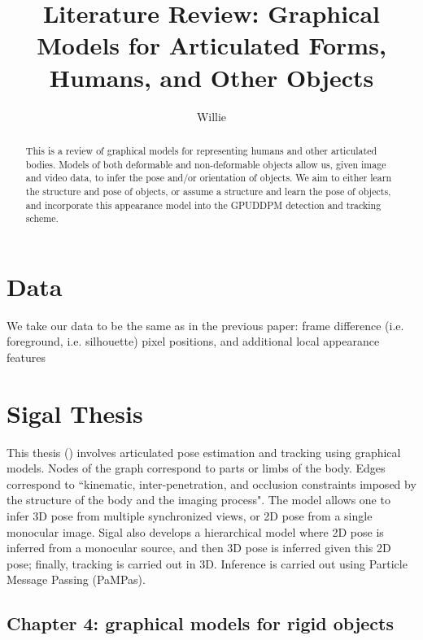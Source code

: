 \documentclass{article}
\begin{document}

\title{Literature Review: Graphical Models for Articulated Forms, Humans, and Other Objects}
\author{Willie}
\maketitle



\begin{abstract}
This is a review of graphical models for representing humans and other articulated bodies. Models of both deformable and non-deformable objects allow us, given image and video data, to infer the pose and/or orientation of objects. We aim to either learn the structure and pose of objects, or assume a structure and learn the pose of objects, and incorporate this appearance model into the GPUDDPM detection and tracking scheme.
\end{abstract}


\section{Data}
We take our data to be the same as in the previous paper: frame difference (i.e. foreground, i.e. silhouette) pixel positions, and additional local appearance features

\section{Sigal Thesis}

This thesis (\cite{Sigal:2008:CGM:1467812}) involves articulated pose estimation and tracking using graphical models.
Nodes of the graph correspond to parts or limbs of the body.
Edges correspond to ``kinematic, inter-penetration, and occlusion constraints imposed by the structure of the body and the imaging process".
The model allows one to infer 3D pose from multiple synchronized views, or 2D pose from a single monocular image. 
Sigal also develops a hierarchical model where 2D pose is inferred from a monocular source, and then 3D pose is inferred given this 2D pose; finally, tracking is carried out in 3D.
Inference is carried out using Particle Message Passing (PaMPas).


\subsection{Chapter 4: graphical models for rigid objects}
\end{document}
